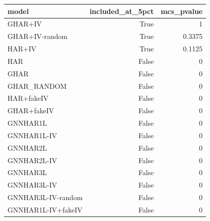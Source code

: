 \begin{tabular}{lrr}
\toprule
model & included_at_5pct & mcs_pvalue \\
\midrule
GHAR+IV & True & 1 \\
GHAR+IV-random & True & 0.3375 \\
HAR+IV & True & 0.1125 \\
HAR & False & 0 \\
GHAR & False & 0 \\
GHAR_RANDOM & False & 0 \\
HAR+fakeIV & False & 0 \\
GHAR+fakeIV & False & 0 \\
GNNHAR1L & False & 0 \\
GNNHAR1L-IV & False & 0 \\
GNNHAR2L & False & 0 \\
GNNHAR2L-IV & False & 0 \\
GNNHAR3L & False & 0 \\
GNNHAR3L-IV & False & 0 \\
GNNHAR3L-IV-random & False & 0 \\
GNNHAR1L-IV+fakeIV & False & 0 \\
\bottomrule
\end{tabular}
